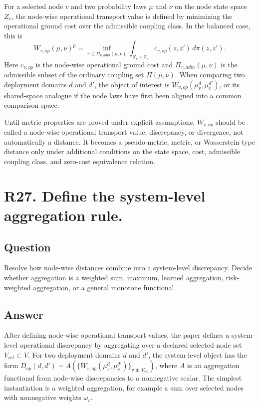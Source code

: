 \documentclass[11pt,a4paper]{article}
\begin{document}
For a selected node \(v\) and two probability laws \(\mu\) and \(\nu\) on the node state space \(Z_v\), the node-wise operational transport value is defined by minimizing the operational ground cost over the admissible coupling class. In the balanced case, this is
\[
W_{v,op}(\mu,\nu)^p = \inf_{\pi \in \Pi_{v,adm}(\mu,\nu)} \int_{Z_v \times Z_v} c_{v,op}(z,z')\, d\pi(z,z').
\]
Here \(c_{v,op}\) is the node-wise operational ground cost and \(\Pi_{v,adm}(\mu,\nu)\) is the admissible subset of the ordinary coupling set \(\Pi(\mu,\nu)\). When comparing two deployment domains \(d\) and \(d'\), the object of interest is \(W_{v,op}(\mu_v^d, \mu_v^{d'})\), or its shared-space analogue if the node laws have first been aligned into a common comparison space.

Until metric properties are proved under explicit assumptions, \(W_{v,op}\) should be called a node-wise operational transport value, discrepancy, or divergence, not automatically a distance. It becomes a pseudo-metric, metric, or Wasserstein-type distance only under additional conditions on the state space, cost, admissible coupling class, and zero-cost equivalence relation.

\section*{R27. Define the system-level aggregation rule.}

\subsection*{Question}

Resolve how node-wise distances combine into a system-level discrepancy. Decide whether aggregation is a weighted sum, maximum, learned aggregation, risk-weighted aggregation, or a general monotone functional.

\subsection*{Answer}

After defining node-wise operational transport values, the paper defines a system-level operational discrepancy by aggregating over a declared selected node set \(V_{sel} \subset V\). For two deployment domains \(d\) and \(d'\), the system-level object has the form \(D_{op}(d,d') = A(\{W_{v,op}(\mu_v^d, \mu_v^{d'})\}_{v \text{ in } V_{sel}})\), where \(A\) is an aggregation functional from node-wise discrepancies to a nonnegative scalar. The simplest instantiation is a weighted aggregation, for example a sum over selected nodes with nonnegative weights \(\omega_v\).
\end{document}
